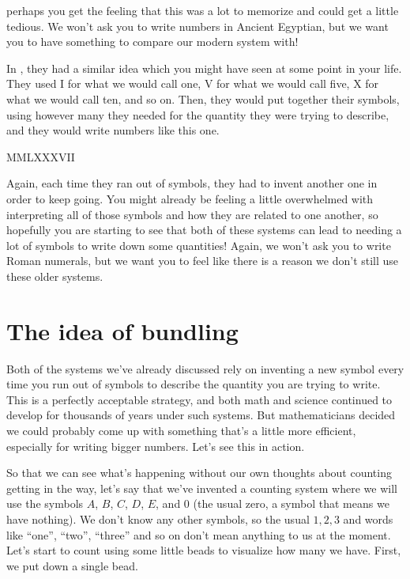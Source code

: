 \documentclass{ximera}
\begin{document}
\begin{center}
\end{center}

perhaps you get the feeling that this was a lot to memorize and could get a little tedious. We won't ask you to write numbers in Ancient Egyptian, but we want you to have something to compare our modern system with!

In , they had a similar idea which you might have seen at some point in your life. They used I for what we would call one, V for what we would call five, X for what we would call ten, and so on. Then, they would put together their symbols, using however many they needed for the quantity they were trying to describe, and they would write numbers like this one. 

\begin{center}
MMLXXXVII
\end{center}

Again, each time they ran out of symbols, they had to invent another one in order to keep going. You might already be feeling a little overwhelmed with interpreting all of those symbols and how they are related to one another, so hopefully you are starting to see that both of these systems can lead to needing a lot of symbols to write down some quantities! Again, we won't ask you to write Roman numerals, but we want you to feel like there is a reason we don't still use these older systems.

\section{The idea of bundling}

Both of the systems we've already discussed rely on inventing a new symbol every time you run out of symbols to describe the quantity you are trying to write. This is a perfectly acceptable strategy, and both math and science continued to develop for thousands of years under such systems. But mathematicians decided we could probably come up with something that's a little more efficient, especially for writing bigger numbers. Let's see this in action.

So that we can see what's happening without our own thoughts about counting getting in the way, let's say that we've invented a counting system where we will use the symbols $A$, $B$, $C$, $D$, $E$, and $0$ (the usual zero, a symbol that means we have nothing). We don't know any other symbols, so the usual $1, 2, 3$ and words like ``one'', ``two'', ``three'' and so on don't mean anything to us at the moment. Let's start to count using some little beads to visualize how many we have. First, we put down a single bead.
\end{document}

